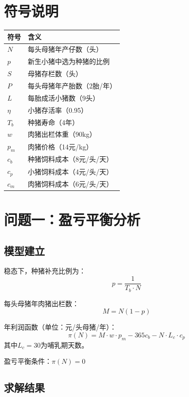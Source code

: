 \documentclass[12pt,a4paper]{article}
\begin{document}
\section{符号说明}

\begin{tabular}{ll}
\toprule
符号 & 含义 \\
\midrule
$N$ & 每头母猪年产仔数（头） \\
$p$ & 新生小猪中选为种猪的比例 \\
$S$ & 母猪存栏数（头） \\
$P$ & 每头母猪年产胎数（2胎/年） \\
$L$ & 每胎成活小猪数（9头） \\
$\eta$ & 小猪存活率（0.95） \\
$T_b$ & 种猪寿命（4年） \\
$w$ & 肉猪出栏体重（90kg） \\
$p_m$ & 肉猪价格（14元/kg） \\
$c_b$ & 种猪饲料成本（8元/头/天） \\
$c_p$ & 小猪饲料成本（4元/头/天） \\
$c_m$ & 肉猪饲料成本（6元/头/天） \\
\bottomrule
\end{tabular}

\section{问题一：盈亏平衡分析}

\subsection{模型建立}

稳态下，种猪补充比例为：
\begin{equation}
p = \frac{1}{T_b \cdot N}
\end{equation}

每头母猪年肉猪出栏数：
\begin{equation}
M = N(1-p)
\end{equation}

年利润函数（单位：元/头母猪/年）：
\begin{equation}
\pi(N) = M \cdot w \cdot p_m - 365c_b - N \cdot L_c \cdot c_p
\end{equation}
其中$L_c = 30$为哺乳期天数。

盈亏平衡条件：$\pi(N) = 0$

\subsection{求解结果}
\end{document}
